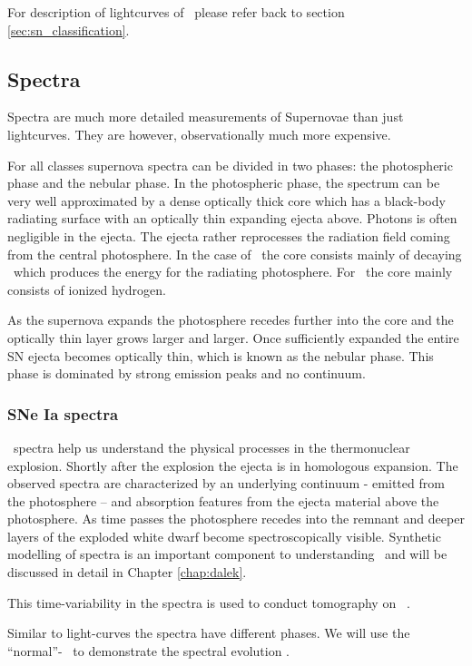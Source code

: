 For description of lightcurves of \sneii\ please refer back to section \ref{sec:sn_classification}.


\subsection{Spectra} 

Spectra are much more detailed measurements of Supernovae than just lightcurves. They are however, observationally much more expensive. 

For all classes supernova spectra can be divided in two phases: the photospheric phase and the nebular phase.
In the photospheric phase, the spectrum can be very well approximated by a dense optically thick core which has a black-body radiating surface with an optically thin expanding ejecta above. Photons is often negligible in the ejecta. The ejecta rather reprocesses the radiation field coming from the central photosphere. 
In the case of \sneia\ the core consists mainly of decaying \Ni\ which produces the energy for the radiating photosphere. For \sneii\ the core mainly consists of ionized hydrogen.

As the supernova expands the photosphere recedes further into the core and the optically thin layer grows larger and larger. Once sufficiently expanded the entire SN ejecta becomes optically thin, which is known as the nebular phase. This phase is dominated by strong emission peaks and no continuum. 


\subsubsection{SNe Ia spectra}

\sneia\ spectra help us understand the physical processes in the thermonuclear explosion. 
Shortly after the explosion the ejecta is in homologous expansion.
The observed spectra are characterized by an underlying continuum - emitted from the photosphere -- and absorption features from the ejecta material above the photosphere. 
As time passes the photosphere recedes into the remnant and deeper layers of the exploded white dwarf become spectroscopically visible. Synthetic modelling of spectra is an important component to understanding \sneia\ and will be discussed in detail in Chapter \ref{chap:dalek}.

This time-variability in the spectra is used to conduct tomography on \sneia\ \citep{2005MNRAS.360.1231S, 2009MNRAS.399.1238H}.

Similar to light-curves the spectra have different phases. We will use the ``normal''-\snia\  to demonstrate the spectral evolution \citep{2011MNRAS.410.1725T}. 


